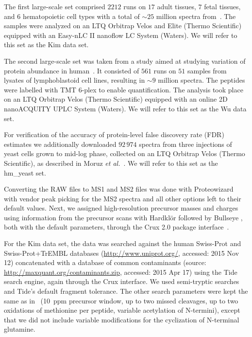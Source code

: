 \documentclass{article}
\begin{document}
The first large-scale set comprised $2212$ runs on $17$ adult tissues,
$7$ fetal tissues, and $6$ hematopoietic cell types with a total of
$\sim 25$ million spectra from~\cite{kim2014draft}. The samples were
analyzed on an LTQ Orbitrap Velos and Elite (Thermo Scientific)
equipped with an Easy-nLC II nanoflow LC System (Waters). We will
refer to this set as the Kim data set.

The second large-scale set was taken from a study aimed at studying
variation of protein abundance in human~\cite{wu2013}. It consisted
of $561$ runs on $51$ samples from lysates of lymphoblastoid cell
lines, resulting in $\sim 9$ million spectra. The peptides were
labelled with TMT 6-plex to enable quantification. The analysis took
place on an LTQ Orbitrap Velos (Thermo Scientific) equipped with an
online 2D nanoACQUITY UPLC System (Waters). We will refer to this set
as the Wu data set.

For verification of the accuracy of protein-level false discovery rate 
(FDR) estimates we additionally downloaded $92\,974$ spectra from 
three injections of yeast cells grown to mid-log phase, collected on 
an LTQ Orbitrap Velos (Thermo Scientific), as described in Moruz {\em 
et al.}~\cite{moruz2013}.  We will refer to this set as the hm\_yeast 
set.

Converting the RAW files to MS1 and MS2 files was done with
Proteowizard~\cite{kessner2008} with vendor peak picking for the MS2
spectra and all other options left to their default values.  Next, we
assigned high-resolution precursor masses and charges using
information from the precursor scans with Hardkl\"{o}r
\cite{hoopmann2007} followed by Bullseye \cite{hsieh2009}, both with
the default parameters, through the Crux 2.0 package
interface~\cite{mcilwain2014}.

For the Kim data set, the data was searched against the human
Swiss-Prot and Swiss-Prot+TrEMBL databases
(\url{http://www.uniprot.org/}, accessed: 2015 Nov 12)
concatenated with a database of common contaminants (source:
\url{http://maxquant.org/contaminants.zip}, accessed: 2015 Apr 17)
using the Tide search engine, again through the Crux interface. We
used semi-tryptic searches and Tide's default fragment tolerance. The
other search parameters were kept the same as in~\cite{kim2014draft}
(10~ppm precursor window, up to two missed cleavages, up to two
oxidations of methionine per peptide, variable acetylation of
N-termini), except that we did not include variable modifications for
the cyclization of N-terminal glutamine. 
\end{document}
